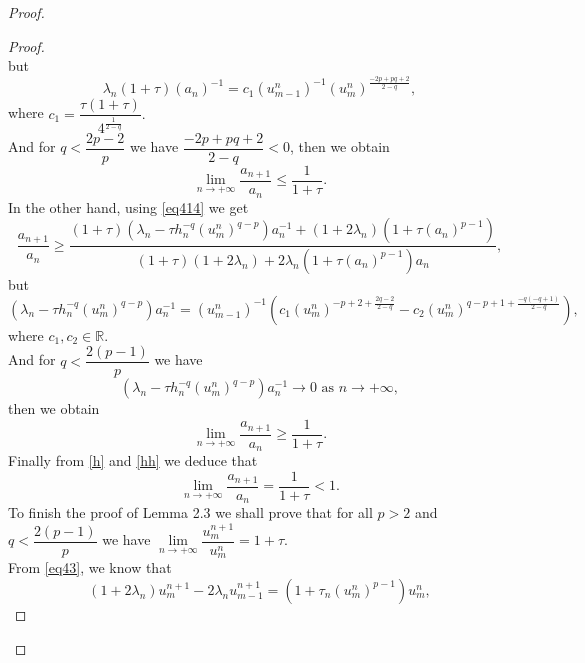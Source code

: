 \documentclass[a4paper,12pt,english,reqno]{smfart}
\begin{document}
\begin{proof}
\begin{proof}
\begin{equation}
			\label{eq416}
			\end{equation}
			but
			\begin{equation*}
			\lambda_{n}(1+\tau)(a_{n})^{-1}=c_{1}(u_{m-1}^{n})^{-1}(u_{m}^{n})^{\frac{-2p+pq+2}{2-q}},
			\end{equation*} 
			where $c_{1}=\dfrac{\tau(1+\tau)}{4^{\frac{1}{2-q}}}.$\\
			And for $q<\dfrac{2p-2}{p}$ we have $\dfrac{-2p+pq+2}{2-q}<0$, then we obtain 
			\begin{equation}
			\lim_{n\rightarrow +\infty}\dfrac{a_{n+1}}{a_{n}}\leq \dfrac{1}{1+\tau}.
			\label{h}
			\end{equation} 
			In the other hand, using \eqref{eq414} we get
			\begin{equation*}
			\frac{a_{n+1}}{a_{n}}
			\geq
			\frac{(1+\tau)(\lambda_{n}-\tau h_{n}^{-q}(u_{m}^{n})^{q-p})a_{n}^{-1}+(1+2\lambda_{n})(1+\tau(a_{n})^{p-1})}{(1+\tau)(1+2\lambda_{n})+2\lambda_{n}(1+\tau(a_{n})^{p-1})a_{n}},
			\label{eq417}
			\end{equation*}
			but
			\begin{equation*}
			(\lambda_{n}-\tau h_{n}^{-q}(u_{m}^{n})^{q-p})a_{n}^{-1}=(u_{m-1}^{n})^{-1}\left(c_{1}\left(u_{m}^{n}\right)^{-p+2+\frac{2q-2}{2-q}}-c_{2}\left(u_{m}^{n}\right)^{q-p+1+\frac{-q(-q+1)}{2-q}}\right),
			\end{equation*} 
			where $c_{1},c_{2} \in \mathbb{R}.$\\
			And for $q<\dfrac{2(p-1)}{p}$ we have
			\begin{equation*}
			 \left(\lambda_{n}-\tau h_{n}^{-q}(u_{m}^{n})^{q-p}\right)a_{n}^{-1}\rightarrow 0 \text{ as } n\rightarrow +\infty,
			 \end{equation*}
			 then we obtain 
			\begin{equation}
			\lim_{n\rightarrow +\infty}\dfrac{a_{n+1}}{a_{n}}\geq \dfrac{1}{1+\tau}.
			\label{hh}
			\end{equation} 
			Finally from \eqref{h} and \eqref{hh} we deduce that
			\begin{equation*}
			\lim_{n\rightarrow +\infty}\dfrac{a_{n+1}}{a_{n}}= \dfrac{1}{1+\tau}<1.
			\end{equation*} 
			To finish the proof of Lemma 2.3 we shall prove that for all $p>2$ and $q<\dfrac{2(p-1)}{p}$ we have $\lim\limits_{n\rightarrow +\infty}\dfrac{u_{m}^{n+1}}{u_{m}^{n}}=1+\tau.$\\
			From \eqref{eq43}, we know that
			\begin{equation*}
			(1+2\lambda_{n})u_{m}^{n+1}-2\lambda_{n}u_{m-1}^{n+1}=(1+\tau_{n}(u_{m}^{n})^{p-1})u_{m}^{n},

\end{equation*}
\end{proof}
\end{proof}
\end{document}
